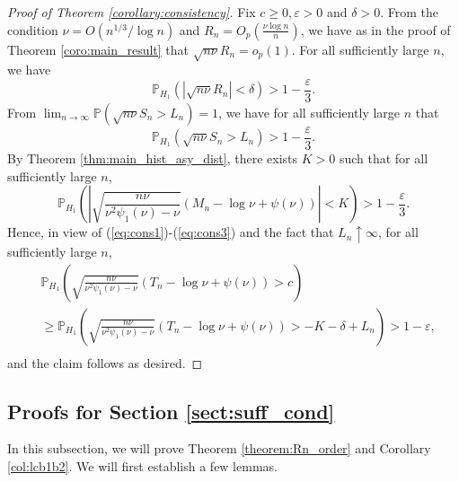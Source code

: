 \documentclass[12pt,letterpaper, twoside, openany]{article}
\theoremstyle{plain}
\begin{document}
\begin{proof}[Proof of Theorem \ref{corollary:consistency}]
	Fix $c \geq 0, \varepsilon> 0$ and $\delta > 0$. From the condition $\nu = O(n^{1/3}/\log n)$ and $R_n = O_p\left(\frac{\nu \log n}{n}\right)$, we have as in the proof of Theorem \ref{coro:main_result} that $\sqrt{n\nu} R_n = o_p(1)$.
For all sufficiently large $n$, we have
\begin{equation}\label{eq:cons1}
    \mathbb{P}_{H_1}( |\sqrt{n\nu} R_n| < \delta) > 1 - \frac{\varepsilon}{3}.
\end{equation}
 From $\lim_{n\rightarrow \infty} \mathbb{P}(\sqrt{n \nu} S_{n} > L_n) = 1$, we have for all sufficiently large $n$ that
\begin{equation}\label{eq:cons2}
    \mathbb{P}_{H_1}( \sqrt{n \nu} S_n > L_n) > 1 - \frac{\varepsilon}{3}.
\end{equation}
 By Theorem \ref{thm:main_hist_asy_dist}, there exists $K > 0$ such that for all sufficiently large $n$,
\begin{equation}\label{eq:cons3}
    	\mathbb{P}_{H_1}\left( \left| \sqrt{ \frac{n\nu}{\nu^2\psi_1(\nu)-\nu}} \left( M_n -  \log \nu +  \psi(\nu) \right)\right| < K \right) > 1 - \frac{\varepsilon}{3}. 
\end{equation}
 	Hence, in view of (\ref{eq:cons1})-(\ref{eq:cons3}) and the fact that $L_n \uparrow \infty$, for all sufficiently large $n$, 
\begin{align*}
    	&\mathbb{P}_{H_1}\left(  \sqrt{ \frac{n\nu}{\nu^2\psi_1(\nu)-\nu}} \left( T_n -  \log \nu +  \psi(\nu) \right) > c \right)\\
     & \geq
     \mathbb{P}_{H_1}\left(  \sqrt{ \frac{n\nu}{\nu^2\psi_1(\nu)-\nu}} \left( T_n -  \log \nu +  \psi(\nu) \right)  > - K -\delta + L_n \right)
          > 1 - \varepsilon,\\
\end{align*}
and the claim follows as desired.
	
\end{proof}




\subsection{Proofs for Section \ref{sect:suff_cond}}
In this subsection, we will prove Theorem \ref{theorem:Rn_order} and Corollary 
\ref{col:lcb1b2}. We will first establish a few lemmas.
\end{document}
